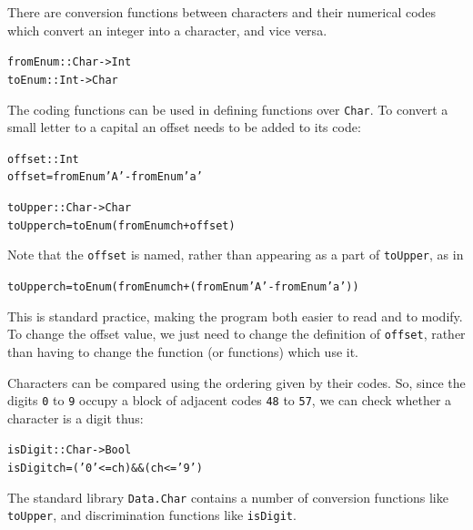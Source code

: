 There are conversion functions between characters and their numerical
codes
which convert an integer into a character, and vice versa. 
\vspace{2pt}

\begin{alltt}
fromEnum :: Char -> Int
toEnum :: Int -> Char
\end{alltt} 
\vspace{2pt}

\noindent The coding functions can be used in defining functions over
\texttt{Char}. To convert a small letter to a capital an offset needs to be
added to its code:
\vspace{2pt}

\begin{alltt}
offset :: Int
offset = fromEnum 'A' - fromEnum 'a'
 
toUpper :: Char -> Char
toUpper ch = toEnum (fromEnum ch + offset)
\end{alltt}
\vspace{2pt}

\noindent Note that the \texttt{offset} is named, rather than appearing as a
part of
\texttt{toUpper}, as in
\vspace{2pt}

\begin{alltt}
toUpper ch = toEnum (fromEnum ch + (fromEnum 'A' - fromEnum 'a'))
\end{alltt} 
\vspace{2pt}

\noindent This is standard
practice, making the program both easier to read
and to modify. To change the offset value, we just need to
change the definition of \texttt{offset}, rather than having to change the
function (or functions) which use it.
 
Characters can be compared using
the ordering given by their codes. So, since the digits \texttt{0} to \texttt{9} occupy
a block of adjacent codes \texttt{48} to \texttt{57}, we can check whether a character 
is a digit thus:
\vspace{2pt}

\begin{alltt}
isDigit :: Char -> Bool
isDigit ch = ('0' <= ch) \&\& (ch <= '9')
\end{alltt}
\vspace{2pt}


\noindent The standard library \texttt{Data.Char} contains a number of conversion functions like
\texttt{toUpper}, and discrimination
functions like \texttt{isDigit}.


